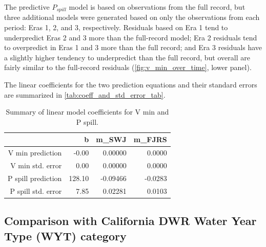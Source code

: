 \documentclass[hess, manuscript]{copernicus}
\begin{document}
The predictive \(P_{spill}\) model is based on observations from the
full record, but three additional models were generated based on only
the observations from each period: Eras 1, 2, and 3, respectively.
Residuals based on Era 1 tend to underpredict Eras 2 and 3 more than the
full-record model; Era 2 residuals tend to overpredict in Eras 1 and 3
more than the full record; and Era 3 residuals have a slightly higher
tendency to underpredict than the full record, but overall are fairly
similar to the full-record residuals (\autoref{fig:v_min_over_time},
lower panel).

The linear coefficients for the two prediction equations and their
standard errors are summarized in \autoref{tab:coeff_and_std_error_tab}.

\begin{table}[ht]
\centering
\caption{Summary of linear model coefficients for V min and P spill.} 
\label{tab:coeff_and_std_error_tab}
\begin{tabular}{rrrr}
  \hline
 & b & m\_SWJ & m\_FJRS \\ 
  \hline
V min prediction & -0.00 & 0.00000 & 0.0000 \\ 
  V min std. error & 0.00 & 0.00000 & 0.0000 \\ 
  P spill prediction & 128.10 & -0.09466 & -0.0283 \\ 
  P spill std. error & 7.85 & 0.02281 & 0.0103 \\ 
   \hline
\end{tabular}
\end{table}

\subsection{Comparison with California DWR Water Year Type (WYT)
category}
\end{document}
